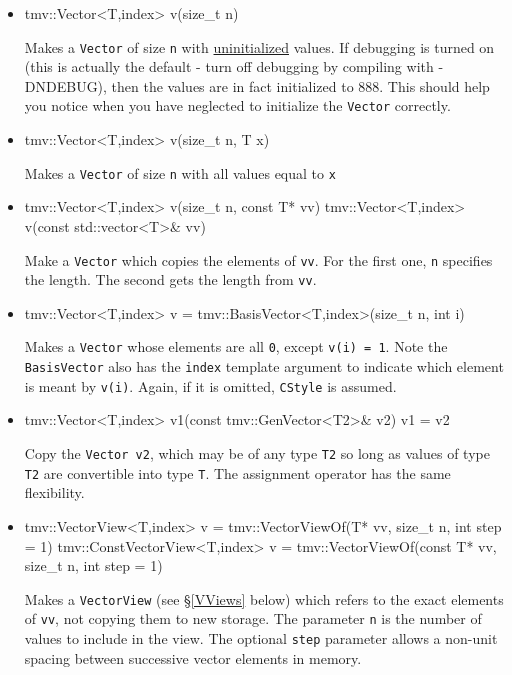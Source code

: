 \documentclass[twoside,letterpaper,11pt]{article}
\renewcommand{\tt}[1]{{\lstinline {#1}}}
\begin{document}
\begin{itemize}
\item 
\begin{tmvcode}
tmv::Vector<T,index> v(size_t n)
\end{tmvcode}
Makes a \tt{Vector} of size \tt{n} with \underline{uninitialized} values.
If debugging is turned on (this is actually the default - 
turn off debugging by compiling
with -DNDEBUG), then the values are in fact initialized to 888.  
This should help you notice
when you have neglected to initialize the \tt{Vector} correctly.

\item
\begin{tmvcode}
tmv::Vector<T,index> v(size_t n, T x)
\end{tmvcode}
Makes a \tt{Vector} of size \tt{n} with all values equal to \tt{x}

\item
\begin{tmvcode}
tmv::Vector<T,index> v(size_t n, const T* vv)
tmv::Vector<T,index> v(const std::vector<T>& vv)
\end{tmvcode}
Make a \tt{Vector} which copies the elements of \tt{vv}.
For the first one, \tt{n} specifies the length.  The second gets
the length from \tt{vv}.

\item
\begin{tmvcode}
tmv::Vector<T,index> v = tmv::BasisVector<T,index>(size_t n, int i)
\end{tmvcode}
Makes a \tt{Vector} whose elements are all \tt{0}, except \tt{v(i) = 1}.
Note the \tt{BasisVector} also has the \tt{index} template argument to 
indicate which element is meant by \tt{v(i)}.  Again, if it is omitted,
\tt{CStyle} is assumed.

\item
\begin{tmvcode}
tmv::Vector<T,index> v1(const tmv::GenVector<T2>& v2)
v1 = v2
\end{tmvcode}
Copy the \tt{Vector v2}, which may be of any type \tt{T2} so long
as values of type \tt{T2} are convertible into type \tt{T}.
The assignment operator has the same flexibility.

\item
\begin{tmvcode}
tmv::VectorView<T,index> v = 
      tmv::VectorViewOf(T* vv, size_t n, int step = 1)
tmv::ConstVectorView<T,index> v = 
      tmv::VectorViewOf(const T* vv, size_t n, int step = 1)
\end{tmvcode}
Makes a \tt{VectorView} (see \S\ref{VViews} below) which refers to the exact
elements of \tt{vv}, not copying them to new storage.  The parameter \tt{n}
is the number of values to include in the view.
The optional \tt{step} parameter allows a non-unit spacing between 
successive vector elements in memory. 

\end{itemize}
\end{document}
